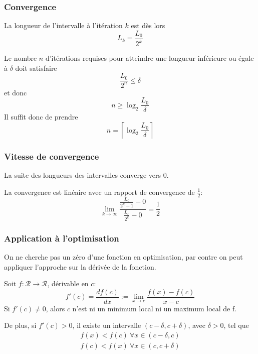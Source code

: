 \documentclass[usepdftitle=false]{beamer}
\def\cR{\mathcal{R}}
\begin{document}
\begin{frame}
\frametitle{Convergence}

La longueur de l'intervalle à l'itération $k$ est dès lors
\[
L_k = \frac{L_0}{2^k}
\]

Le nombre $n$ d'itérations requises pour atteindre une longueur
inférieure ou égale à $\delta$ doit satisfaire
\[
\frac{L_0}{2^n} \leq \delta
\]
et donc
\[
n \geq \log_2 \frac{L_0}{\delta}
\]
Il suffit donc de prendre
\[
n = \left\lceil \log_2 \frac{L_0}{\delta} \right\rceil
\]

\end{frame}

\begin{frame}
\frametitle{Vitesse de convergence}

La suite des longueurs des intervalles converge vers 0.

\mbox{}

La convergence est linéaire avec un rapport de convergence de $\frac{1}{2}$:
$$
\lim_{k \rightarrow \infty} \frac{\frac{L_0}{2^k+1}-0}{\frac{L_0}{2^k}-0} = \frac{1}{2}
$$

\end{frame}

\begin{frame}
\frametitle{Application à l'optimisation}

On ne cherche pas un zéro d'une fonction en optimisation, par contre on peut appliquer l'approche sur la dérivée de la fonction.

\mbox{}

Soit $f: \cR \rightarrow \cR$, dérivable en $c$:
$$
f'(c) = \frac{df(c)}{dx} := \lim_{x \rightarrow c} \frac{f(x)-f(c)}{x-c}
$$
Si $f'(c) \ne 0$, alors $c$ n'est ni un minimum local ni un maximum local de f.

\mbox{}

De plus, si $f'(c) > 0$, il existe un intervalle $(c-\delta, c+\delta)$, avec $\delta > 0$, tel que
\begin{align*}
f(x) < f(c) \ \forall x \in (c-\delta, c)\\
f(c) < f(x) \ \forall x \in (c, c+\delta)\\
\end{align*}

\end{frame}
\end{document}
